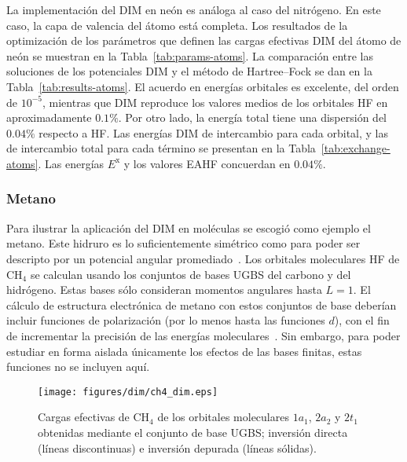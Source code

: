 La implementación del DIM en neón es análoga al caso del nitrógeno. En
este caso, la capa de valencia del átomo está completa. Los resultados 
de la optimización de los parámetros que definen las cargas efectivas 
DIM del átomo de neón se muestran en la Tabla~\ref{tab:params-atoms}. La 
comparación entre las soluciones de los potenciales DIM y el método de 
Hartree--Fock se dan en la Tabla~\ref{tab:results-atoms}. El acuerdo en 
energías orbitales es excelente, del orden de $10^{-5}$, 
mientras que DIM reproduce los valores medios de los orbitales HF en 
aproximadamente $0.1\%$. Por otro lado, la energía total tiene una 
dispersión del $0.04\%$ respecto a HF. Las energías DIM de intercambio 
para cada orbital, y las de intercambio total para cada término se 
presentan en la Tabla~\ref{tab:exchange-atoms}. Las energías 
$E^{\mathrm{x}}$ y los valores EAHF concuerdan en $0.04\%$.

\subsubsection{Metano}

Para ilustrar la aplicación del DIM en moléculas se escogió como ejemplo 
el metano. Este hidruro es lo suficientemente simétrico como para poder 
ser descripto por un potencial angular promediado~\cite{Granados:16}. 
Los orbitales moleculares HF de CH$_4$ se calculan usando los conjuntos 
de bases UGBS del carbono y del hidrógeno. Estas bases sólo consideran 
momentos angulares hasta $L=1$. El cálculo de estructura electrónica de 
metano con estos conjuntos de base deberían incluir funciones de 
polarización (por lo menos hasta las funciones $d$), con el fin de 
incrementar la precisión de las energías 
moleculares~\cite{Rothenberg:71,Hariharan:72}. Sin embargo, para poder 
estudiar en forma aislada únicamente los efectos de las bases finitas, 
estas funciones no se incluyen aquí. 

\begin{figure}[t]
\centering
\texttt{[image: figures/dim/ch4\_dim.eps]}
\caption[Cargas invertidas y depuradas de metano.]
{Cargas efectivas de CH$_4$ de los orbitales moleculares $1a_1$, $2a_2$ 
y $2t_1$ obtenidas mediante el conjunto de base UGBS; inversión directa 
(líneas discontinuas) e inversión depurada (líneas sólidas).}
\label{fig:ch4zeff}
\end{figure}

